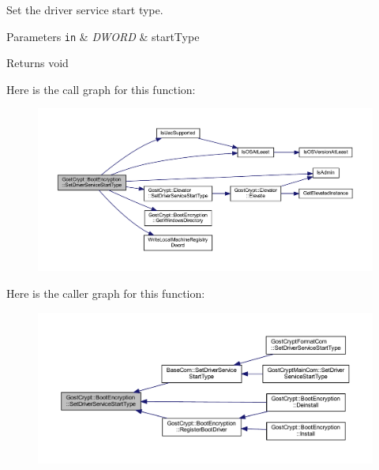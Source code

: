 Set the driver service start type. 


\begin{DoxyParams}[1]{Parameters}
\mbox{\tt in}  & {\em D\+W\+O\+RD} & start\+Type \\
\hline
\end{DoxyParams}
\begin{DoxyReturn}{Returns}
void 
\end{DoxyReturn}
Here is the call graph for this function\+:
\nopagebreak
\begin{figure}[H]
\begin{center}
\leavevmode
\includegraphics[width=350pt]{class_gost_crypt_1_1_boot_encryption_ad66126952d3c90239d15fe53b98d98be_cgraph}
\end{center}
\end{figure}
Here is the caller graph for this function\+:
\nopagebreak
\begin{figure}[H]
\begin{center}
\leavevmode
\includegraphics[width=350pt]{class_gost_crypt_1_1_boot_encryption_ad66126952d3c90239d15fe53b98d98be_icgraph}
\end{center}
\end{figure}
\mbox{\label{class_gost_crypt_1_1_boot_encryption_a06e9ef71b195c22837580dc678bb1e3f}} 
